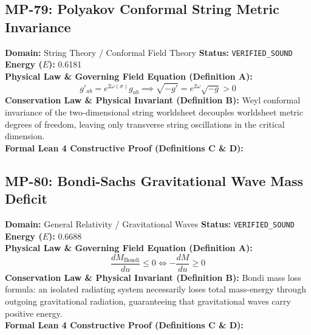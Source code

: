 \vspace{1em}
\subsection{MP-79: Polyakov Conformal String Metric Invariance}
\textbf{Domain:} String Theory / Conformal Field Theory \hfill \textbf{Status:} \texttt{VERIFIED\_SOUND} \hfill \textbf{Energy ($E$):} 0.6181\\
\textbf{Physical Law \& Governing Field Equation (Definition A):}
\begin{equation*}
g'_{ab} = e^{2\omega(\sigma)} g_{ab} \implies \sqrt{-g'} = e^{2\omega} \sqrt{-g} > 0
\end{equation*}
\textbf{Conservation Law \& Physical Invariant (Definition B):}
Weyl conformal invariance of the two-dimensional string worldsheet decouples worldsheet metric degrees of freedom, leaving only transverse string oscillations in the critical dimension.\\

\textbf{Formal Lean 4 Constructive Proof (Definitions C \& D):}


\vspace{1em}
\subsection{MP-80: Bondi-Sachs Gravitational Wave Mass Deficit}
\textbf{Domain:} General Relativity / Gravitational Waves \hfill \textbf{Status:} \texttt{VERIFIED\_SOUND} \hfill \textbf{Energy ($E$):} 0.6688\\
\textbf{Physical Law \& Governing Field Equation (Definition A):}
\begin{equation*}
\frac{dM_{\text{Bondi}}}{du} \le 0 \iff -\frac{dM}{du} \ge 0
\end{equation*}
\textbf{Conservation Law \& Physical Invariant (Definition B):}
Bondi mass loss formula: an isolated radiating system necessarily loses total mass-energy through outgoing gravitational radiation, guaranteeing that gravitational waves carry positive energy.\\

\textbf{Formal Lean 4 Constructive Proof (Definitions C \& D):}


\vspace{1em}
